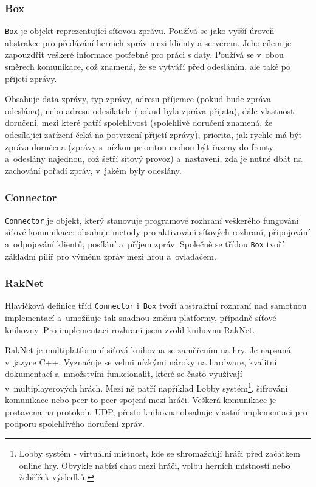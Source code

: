\documentclass[thesis=B,czech,hidelinks]{FITthesis}[2012/06/26] %
\newcommand{\code}[1]{\texttt{#1}}
\begin{document}
\subsubsection{Box}

\code{Box} je objekt reprezentující síťovou zprávu. Používá se jako vyšší úroveň abstrakce pro předávání herních zpráv mezi klienty a serverem. Jeho cílem je zapouzdřit veškeré informace potřebné pro práci s daty. Používá se v~obou směrech komunikace, což znamená, že se vytváří před odesláním, ale také po přijetí zprávy.

Obsahuje data zprávy, typ zprávy, adresu příjemce (pokud bude zpráva odeslána), nebo adresu odesílatele (pokud byla zpráva přijata), dále vlastnosti doručení, mezi které patří spolehlivost (spolehlivé doručení znamená, že odesílající zařízení čeká na potvrzení přijetí zprávy), priorita, jak rychle má být zpráva doručena (zprávy s~nízkou prioritou mohou být řazeny do fronty a~odeslány najednou, což šetří síťový provoz) a~nastavení, zda je nutné dbát na zachování pořadí zpráv, v~jakém byly odeslány.

\subsubsection{Connector}

\code{Connector} je objekt, který stanovuje programové rozhraní veškerého fungování síťové komunikace: obsahuje metody pro aktivování síťových rozhraní, připojování a~odpojování klientů, posílání a~příjem zpráv. Společně se třídou \code{Box} tvoří základní pilíř pro výměnu zpráv mezi hrou a~ovladačem.

\subsubsection{RakNet}

Hlavičková definice tříd \code{Connector} i~\code{Box} tvoří abstraktní rozhraní nad samotnou implementací a~umožňuje tak snadnou změnu platformy, případně síťové knihovny. Pro implementaci rozhraní jsem zvolil knihovnu RakNet.

RakNet je multiplatformní síťová knihovna se zaměřením na hry. Je napsaná v~jazyce C++. Vyznačuje se velmi nízkými nároky na hardware, kvalitní dokumentací a~množstvím funkcionalit, které se často využívají v~multiplayerových hrách. \cite{raknet} Mezi ně patří například Lobby systém\footnote{Lobby systém - virtuální místnost, kde se shromažďují hráči před začátkem online hry. Obvykle nabízí chat mezi hráči, volbu herních místností nebo žebříček výsledků.}, šifrování komunikace nebo peer-to-peer spojení mezi hráči. Veškerá komunikace je postavena na protokolu UDP, přesto knihovna obsahuje vlastní implementaci pro podporu spolehlivého doručení zpráv.
\end{document}
